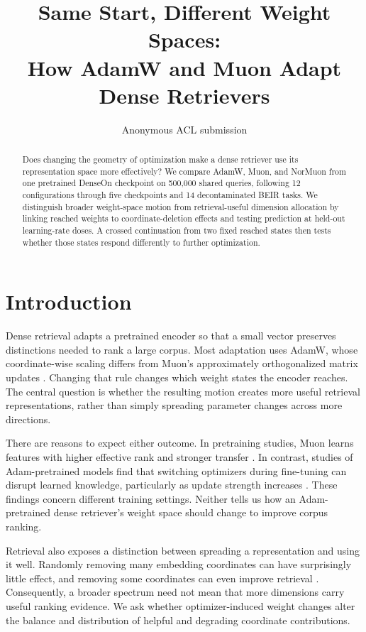 \documentclass[11pt]{article}
\title{Same Start, Different Weight Spaces:\\
How AdamW and Muon Adapt Dense Retrievers}
\author{Anonymous ACL submission}
\begin{document}
\maketitle

\begin{abstract}
Does changing the geometry of optimization make a dense retriever use its representation space
more effectively? We compare AdamW, Muon, and NorMuon from one pretrained DenseOn checkpoint on
500,000 shared queries, following 12 configurations through five checkpoints and 14 decontaminated
BEIR tasks. \CorrectedAbstractFinding{} We distinguish broader weight-space motion from
retrieval-useful dimension allocation by linking reached weights to coordinate-deletion effects
and testing prediction at held-out learning-rate doses. A crossed continuation from two fixed
reached states then tests whether those states respond differently to further optimization.
\StateOperatorAbstractFinding{}
\end{abstract}

\section{Introduction}

Dense retrieval adapts a pretrained encoder so that a small vector preserves distinctions needed
to rank a large corpus. Most adaptation uses AdamW, whose coordinate-wise scaling differs from
Muon's approximately orthogonalized matrix updates
\citep{loshchilov2019decoupled,liu2025muon}. Changing that rule changes which weight states the
encoder reaches. The central question is whether the resulting motion creates more useful
retrieval representations, rather than simply spreading parameter changes across more directions.

There are reasons to expect either outcome. In pretraining studies, Muon learns features with
higher effective rank and stronger transfer \citep{ruan2026features}. In contrast, studies of
Adam-pretrained models find that switching optimizers during fine-tuning can disrupt learned
knowledge, particularly as update strength increases \citep{qu2026finetune,liu2026consistency}.
These findings concern different training settings. Neither tells us how an Adam-pretrained dense
retriever's weight space should change to improve corpus ranking.

Retrieval also exposes a distinction between spreading a representation and using it well.
Randomly removing many embedding coordinates can have surprisingly little effect, and removing
some coordinates can even improve retrieval \citep{takeshita2025dimensions}. Consequently, a
broader spectrum need not mean that more dimensions carry useful ranking evidence. We ask whether
optimizer-induced weight changes alter the balance and distribution of helpful and degrading
coordinate contributions.
\end{document}
